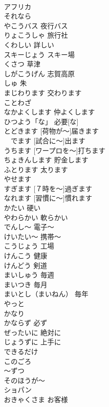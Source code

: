 \documentclass[8pt]{extreport}
\begin{document}
\begin{CJK}{UTF8}{min}
\\	アフリカ			
\\	それなら			
\\	やこうバス	夜行バス	
\\	りょこうしゃ	旅行社	
\\	くわしい	詳しい	
\\	スキーじょう	スキー場	
\\	くさつ	草津	
\\	しがこうげん	志賀高原	
\\	しゅ	朱	
\\	まじわります	交わります	
\\	ことわざ			
\\	なかよくします	仲よくします	
\\	ひつよう「な」	必要[な]	
\\	[にもつが～] とどきます	[荷物が～]届きます	
\\	[しあいに～]　でます	[試合に～]出ます	
\\	[ワープロを～]うちます	[ワープロを～]打ちます	
\\	ちょきんします	貯金します	
\\	ふとります	太ります	
\\	やせます			
\\	[７じを～] すぎます	[７時を～]過ぎます	
\\	[しゅうかんに～] なれます	[習慣に～]慣れます	
\\	かたい	硬い	
\\	やわらかい	軟らかい	
\\	でんし～	電子～	
\\	けいたい～	携帯～	
\\	こうじょう	工場	
\\	けんこう	健康	
\\	けんどう	剣道	
\\	まいしゅう	毎週	
\\	まいつき	毎月	
\\	まいとし（まいねん）	毎年	
\\	やっと			
\\	かなり			
\\	かならず	必ず	
\\	ぜったいに	絶対に	
\\	じょうずに	上手に	
\\	できるだけ			
\\	このごろ			
\\	～ずつ			
\\	そのほうが～			
\\	ショパン			
\\	おきゃくさま	お客様	

\end{CJK}
\end{document}
